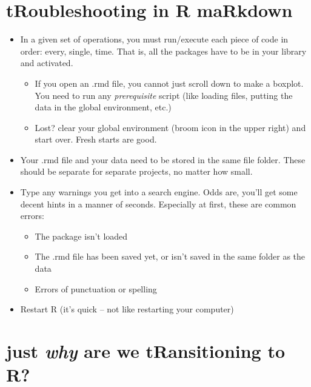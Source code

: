 \documentclass[
  english,
]{book}
\providecommand{\tightlist}{%
  \setlength{\itemsep}{0pt}\setlength{\parskip}{0pt}}
\begin{document}
\hypertarget{troubleshooting-in-r-markdown-1}{%
\section{tRoubleshooting in R maRkdown}\label{troubleshooting-in-r-markdown-1}}

\begin{itemize}
\tightlist
\item
  In a given set of operations, you must run/execute each piece of code in order: every, single, time. That is, all the packages have to be in your library and activated.

  \begin{itemize}
  \tightlist
  \item
    If you open an .rmd file, you cannot just scroll down to make a boxplot. You need to run any \emph{prerequisite} script (like loading files, putting the data in the global environment, etc.)
  \item
    Lost? clear your global environment (broom icon in the upper right) and start over. Fresh starts are good.
  \end{itemize}
\item
  Your .rmd file and your data need to be stored in the same file folder. These should be separate for separate projects, no matter how small.
\item
  Type any warnings you get into a search engine. Odds are, you'll get some decent hints in a manner of seconds. Especially at first, these are common errors:

  \begin{itemize}
  \tightlist
  \item
    The package isn't loaded
  \item
    The .rmd file has been saved yet, or isn't saved in the same folder as the data
  \item
    Errors of punctuation or spelling
  \end{itemize}
\item
  Restart R (it's quick -- not like restarting your computer)
\end{itemize}

\hypertarget{just-why-are-we-transitioning-to-r}{%
\section{\texorpdfstring{just \emph{why} are we tRansitioning to R?}{just why are we tRansitioning to R?}}\label{just-why-are-we-transitioning-to-r}}
\end{document}

